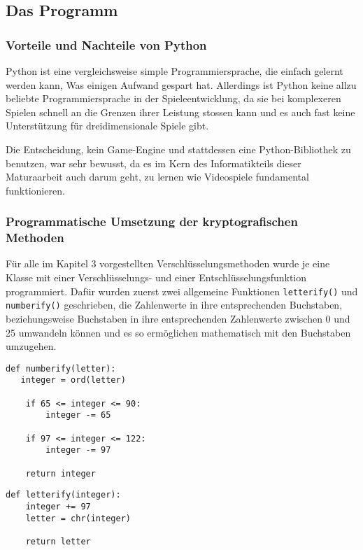 \subsection{Das Programm}

\subsubsection{Vorteile und Nachteile von Python}
Python ist eine vergleichsweise simple Programmiersprache, die einfach gelernt werden kann, Was einigen Aufwand gespart hat. Allerdings ist Python keine allzu beliebte Programmiersprache in der Spieleentwicklung, da sie bei komplexeren Spielen schnell an die Grenzen ihrer Leistung stossen kann und es auch fast keine Unterstützung für dreidimensionale Spiele gibt.
 
Die Entscheidung, kein Game-Engine und stattdessen eine Python-Bibliothek zu benutzen, war sehr bewusst, da es im Kern des Informatikteils dieser Maturaarbeit auch darum geht, zu lernen wie Videospiele fundamental funktionieren. 

\subsubsection{Programmatische Umsetzung der kryptografischen Methoden}
Für alle im Kapitel 3 vorgestellten Verschlüsselungsmethoden wurde je eine Klasse mit einer Verschlüsselungs- und einer Entschlüsselungsfunktion programmiert. Dafür wurden zuerst zwei allgemeine Funktionen \verb+letterify()+ und \verb+numberify()+ geschrieben, die Zahlenwerte in ihre entsprechenden Buchstaben, beziehungsweise Buchstaben in ihre entsprechenden Zahlenwerte zwischen 0 und 25 umwandeln können und es so ermöglichen mathematisch mit den Buchstaben umzugehen.

\begin{Verbatim}
def numberify(letter):
   integer = ord(letter)

    if 65 <= integer <= 90:
        integer -= 65

    if 97 <= integer <= 122:
        integer -= 97

    return integer
\end{Verbatim}

\newpage

\begin{Verbatim}
def letterify(integer):
    integer += 97
    letter = chr(integer)

    return letter
\end{Verbatim}

